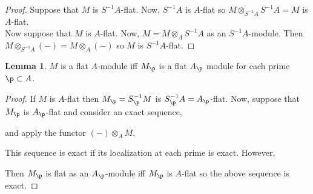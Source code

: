 \documentclass[12pt]{extarticle}
\theoremstyle{definition}
\newtheorem{lemma}[theorem]{Lemma}
\begin{document}
\begin{proof}
Suppose that $M$ is $S^{-1} A$-flat. Now, $S^{-1} A$ is $A$-flat so $M \otimes_{S^{-1} A} S^{-1} A = M$ is $A$-flat.
\bigskip\\
Now suppose that $M$ is $A$-flat. Now, $M = M \otimes_{A} S^{-1} A$ as an $S^{-1} A$-module. Then $M \otimes_{S^{-1} A} (-) = M \otimes_{A} (-)$ so $M$ is $S^{-1}A$-flat.
\end{proof}

\begin{lemma}
$M$ is a flat $A$-module iff $M_\p$ is a flat $A_\p$ module for each prime $\p \subset A$. 
\end{lemma}

\begin{proof}
If $M$ is $A$-flat then $M_\p = S_\p^{-1} M$ is $S^{-1}_\p A = A_\p$-flat. Now, suppose that $M_\p$ is $A_\p$-flat and consider an exact sequence,
\begin{center}
\end{center}
and apply the functor $(-) \otimes_A M$,
\begin{center}
\end{center}
This sequence is exact if its localization at each prime is exact. However,
\begin{center}
\end{center}
Then $M_\p$ is flat as an $A_\p$-module iff $M_\p$ is $A$-flat so the above sequence is exact. 
\end{proof}
\end{document}
